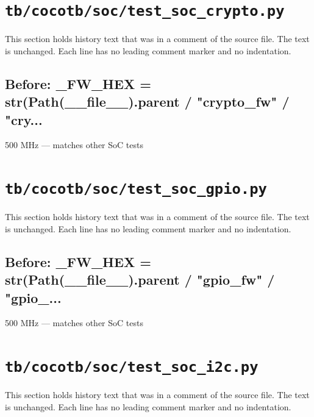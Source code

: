 \section{\texttt{tb/cocotb/soc/test\_soc\_crypto.py}}\label{cr:suite:soc-test-soc-crypto}

This section holds history text that was in a comment of the source file. The text is unchanged. Each line has no leading comment marker and no indentation.

\begin{record}

\subsection*{Before: \_FW\_HEX = str(Path(\_\_file\_\_).parent / "crypto\_fw" / "cry...}

\begin{textblock}
500 MHz — matches other SoC tests
\end{textblock}

\end{record}

\section{\texttt{tb/cocotb/soc/test\_soc\_gpio.py}}\label{cr:suite:soc-test-soc-gpio}

This section holds history text that was in a comment of the source file. The text is unchanged. Each line has no leading comment marker and no indentation.

\begin{record}

\subsection*{Before: \_FW\_HEX = str(Path(\_\_file\_\_).parent / "gpio\_fw" / "gpio\_...}

\begin{textblock}
500 MHz — matches other SoC tests
\end{textblock}

\end{record}

\section{\texttt{tb/cocotb/soc/test\_soc\_i2c.py}}\label{cr:suite:soc-test-soc-i2c}

This section holds history text that was in a comment of the source file. The text is unchanged. Each line has no leading comment marker and no indentation.

